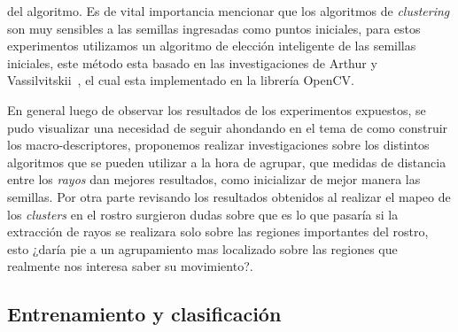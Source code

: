 del algoritmo. Es de vital importancia mencionar que los algoritmos de \textit{clustering} son muy sensibles a las semillas ingresadas como puntos iniciales, para estos experimentos utilizamos un algoritmo de elección inteligente de las semillas iniciales, este método esta basado en las investigaciones de Arthur y Vassilvitskii~\cite{Arthur2007}, el cual esta implementado en la librería OpenCV.

En general luego de observar los resultados de los experimentos expuestos, se pudo visualizar una necesidad de seguir ahondando en el tema de como construir los macro-descriptores, proponemos realizar investigaciones sobre los distintos algoritmos que se pueden utilizar a la hora de agrupar, que medidas de distancia entre los \textit{rayos} dan mejores resultados, como inicializar de mejor manera las semillas. Por otra parte revisando los resultados obtenidos al realizar el mapeo de los \textit{clusters} en el rostro surgieron dudas sobre que es lo que pasaría si la extracción de rayos se realizara solo sobre las regiones importantes del rostro, esto ¿daría pie a un agrupamiento mas localizado sobre las regiones que realmente nos interesa saber su movimiento?. 


\subsection{ Entrenamiento y clasificación }




%
%
%
